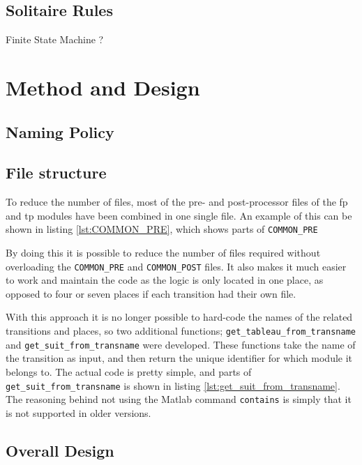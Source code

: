 \documentclass[runningheads,a4paper]{llncs}
\newcommand{\GPenSIM}{../GPenSIM}
\begin{document}
\subsection{Solitaire Rules}


Finite State Machine ?


\section{Method and Design}
\label{sec:2_method_and_design}
\subsection{Naming Policy}
\subsection{File structure}
\label{sec:2_file_structure}
To reduce the number of files, most of the pre- and post-processor files of the \ac{fp} and \ac{tp} modules have been combined in one single file. An example of this can be shown in listing \ref{lst:COMMON_PRE}, which shows parts of \verb!COMMON_PRE!


By doing this it is possible to reduce the number of files required without overloading the \verb!COMMON_PRE! and \verb!COMMON_POST! files. It also makes it much easier to work and maintain the code as the logic is only located in one place, as opposed to four or seven places if each transition had their own file.
\newline

With this approach it is no longer possible to hard-code the names of the related transitions and places, so two additional functions; \verb!get_tableau_from_transname! and \verb!get_suit_from_transname! were developed. These functions take the name of the transition as input, and then return the unique identifier for which module it belongs to. The actual code is pretty simple, and parts of \verb!get_suit_from_transname! is shown in listing \ref{lst:get_suit_from_transname}. The reasoning behind not using the Matlab command \verb!contains! is simply that it is not supported in older versions.

\clearpage
\subsection{Overall Design}
\end{document}
